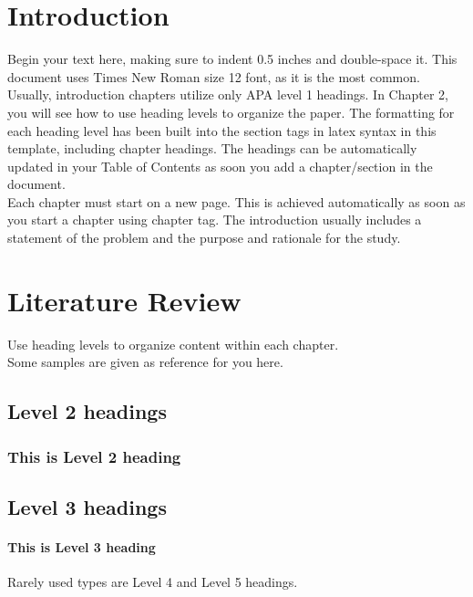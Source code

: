 \documentclass[12pt]{report}
\begin{document}
\newpage
\tableofcontents
\newpage
\listoftables
\newpage
\listoffigures

\clearpage
{} %
\setcounter{page}{1}   %

\chapter{Introduction}
Begin your text here, making sure to indent 0.5 inches and double-space it. This document uses Times New Roman size 12 font, as it is the most common.
\\
Usually, introduction chapters utilize only APA level 1 headings. In Chapter 2, you will see how to use heading levels to organize the paper. The formatting for each heading level has been built into the section tags in latex syntax in this template, including chapter headings. The headings can be automatically updated in your Table of Contents as soon you add a chapter/section in the document.
\\
Each chapter must start on a new page. This is achieved automatically as soon as you start a chapter using chapter tag. The introduction usually includes a statement of the problem and the purpose and rationale for the study.

\chapter{Literature Review}
Use heading levels to organize content within each chapter. 
\\
Some samples are given as reference for you here.

\section{Level 2 headings}
\subsection{This is Level 2 heading}


\section{Level 3 headings}
\subsubsection{This is Level 3 heading}
Rarely used types are Level 4 and Level 5 headings.
\end{document}

